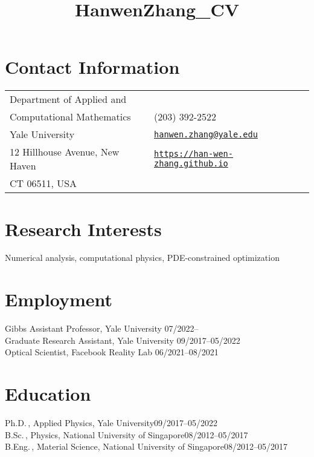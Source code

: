 \documentclass[margin,line,pifont,palatino,courier]{res}
\begin{document}
\title{HanwenZhang_CV}
\begin{resume}

\section{\sc Contact Information}

\vspace{.05in}
\begin{tabular}{@{}p{2.75in}p{2in}}
Department of Applied  and &  \\
Computational Mathematics & (203) 392-2522 \\
Yale University &  
\href{mailto:hanwen.zhang@yale.edu}
{\texttt{hanwen.zhang@yale.edu}}\\
12 Hillhouse Avenue, New Haven & 
\href{https://han-wen-zhang.github.io/}
{\texttt{https://han-wen-zhang.github.io}}\\
 CT 06511, USA   & \\
             
\end{tabular}

\section{\sc Research Interests}
Numerical analysis, computational physics, PDE-constrained optimization

\section{\sc Employment}
Gibbs Assistant Professor, Yale University \hfill  07/2022-- \hspace*{1.12cm}\\
Graduate Research Assistant, Yale University \hfill 09/2017--05/2022\\
Optical Scientist, Facebook Reality Lab \hfill 06/2021--08/2021

\section{\sc Education}
Ph.D.\,, Applied Physics, Yale University\hfill 09/2017--05/2022\\
B.Sc.\,, Physics, National University of Singapore\hfill 08/2012--05/2017\\
B.Eng.\,, Material Science, National University of Singapore\hfill 08/2012--05/2017


\end{resume}
\end{document}
